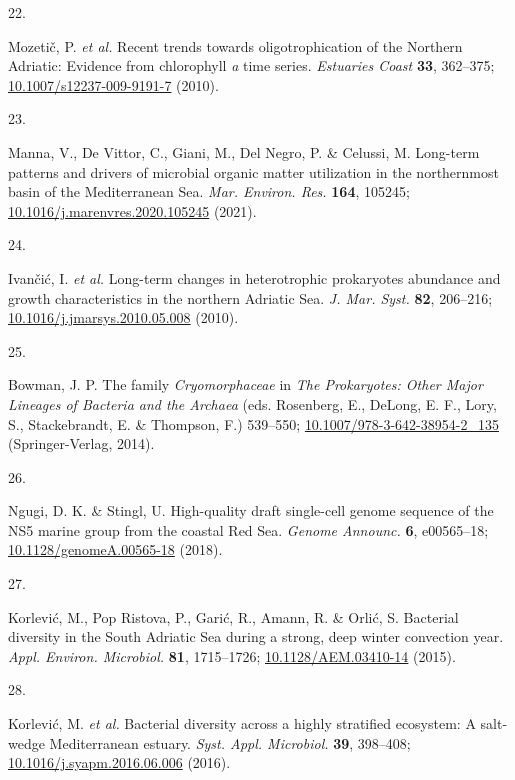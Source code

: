 \documentclass[
  12pt,
]{article}
\newlength{\cslhangindent}
\newlength{\csllabelwidth}
\newlength{\cslentryspacingunit} %
\newenvironment{CSLReferences}[2] %
 {%
  \setlength{\parindent}{0pt}
  \ifodd #1
  \let\oldpar\par
  \def\par{\hangindent=\cslhangindent\oldpar}
  \fi
  \setlength{\parskip}{#2\cslentryspacingunit}
 }%
 {}
\newcommand{\CSLLeftMargin}[1]{\parbox[t]{\csllabelwidth}{#1}}
\newcommand{\CSLRightInline}[1]{\parbox[t]{\linewidth - \csllabelwidth}{#1}\break}
\begin{document}
\begin{CSLReferences}{0}{0}
\leavevmode{}%
\CSLLeftMargin{22. }
\CSLRightInline{Mozetič, P. \emph{et al.} Recent trends towards
oligotrophication of the {Northern Adriatic}: Evidence from chlorophyll
{\emph{a}} time series. \emph{Estuaries Coast} \textbf{33}, 362--375;
\href{https://doi.org/10.1007/s12237-009-9191-7}{10.1007/s12237-009-9191-7}
(2010).}

\leavevmode{}%
\CSLLeftMargin{23. }
\CSLRightInline{Manna, V., De Vittor, C., Giani, M., Del Negro, P. \&
Celussi, M. Long-term patterns and drivers of microbial organic matter
utilization in the northernmost basin of the {Mediterranean Sea}.
\emph{Mar. Environ. Res.} \textbf{164}, 105245;
\href{https://doi.org/10.1016/j.marenvres.2020.105245}{10.1016/j.marenvres.2020.105245}
(2021).}

\leavevmode{}%
\CSLLeftMargin{24. }
\CSLRightInline{Ivančić, I. \emph{et al.} Long-term changes in
heterotrophic prokaryotes abundance and growth characteristics in the
northern {Adriatic Sea}. \emph{J. Mar. Syst.} \textbf{82}, 206--216;
\href{https://doi.org/10.1016/j.jmarsys.2010.05.008}{10.1016/j.jmarsys.2010.05.008}
(2010).}

\leavevmode{}%
\CSLLeftMargin{25. }
\CSLRightInline{Bowman, J. P. The family {\emph{Cryomorphaceae}} in
\emph{The {Prokaryotes}: {Other Major Lineages} of {Bacteria} and the
{Archaea}} (eds. Rosenberg, E., DeLong, E. F., Lory, S., Stackebrandt,
E. \& Thompson, F.) 539--550;
\href{https://doi.org/10.1007/978-3-642-38954-2_135}{10.1007/978-3-642-38954-2\_135}
({Springer-Verlag}, 2014).}

\leavevmode{}%
\CSLLeftMargin{26. }
\CSLRightInline{Ngugi, D. K. \& Stingl, U. High-quality draft
single-cell genome sequence of the {NS5} marine group from the coastal
{Red Sea}. \emph{Genome Announc.} \textbf{6}, e00565--18;
\href{https://doi.org/10.1128/genomeA.00565-18}{10.1128/genomeA.00565-18}
(2018).}

\leavevmode{}%
\CSLLeftMargin{27. }
\CSLRightInline{Korlević, M., Pop Ristova, P., Garić, R., Amann, R. \&
Orlić, S. Bacterial diversity in the {South Adriatic Sea} during a
strong, deep winter convection year. \emph{Appl. Environ. Microbiol.}
\textbf{81}, 1715--1726;
\href{https://doi.org/10.1128/AEM.03410-14}{10.1128/AEM.03410-14}
(2015).}

\leavevmode{}%
\CSLLeftMargin{28. }
\CSLRightInline{Korlević, M. \emph{et al.} Bacterial diversity across a
highly stratified ecosystem: A salt-wedge {Mediterranean} estuary.
\emph{Syst. Appl. Microbiol.} \textbf{39}, 398--408;
\href{https://doi.org/10.1016/j.syapm.2016.06.006}{10.1016/j.syapm.2016.06.006}
(2016).}


\end{CSLReferences}
\end{document}
